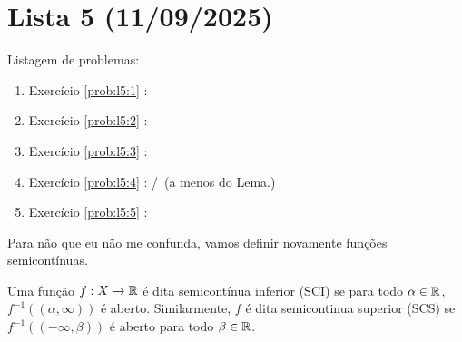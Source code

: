 \section{Lista 5 (11/09/2025)}

Listagem de problemas:
\begin{enumerate}
    \item Exercício \ref{prob:l5:1} : \checkmark
    \item Exercício \ref{prob:l5:2} : \checkmark
    \item Exercício \ref{prob:l5:3} : \checkmark
    \item Exercício \ref{prob:l5:4} : \Frowny/\checkmark\, (a menos do Lema.)
    \item Exercício \ref{prob:l5:5} : \checkmark
\end{enumerate}

\begin{problem}
    \label{prob:l5:1}
\end{problem}
Para não que eu não me confunda, vamos definir novamente funções semicontínuas.
\begin{definition}
    Uma função $f: X \rightarrow \mathbb{R}$ é dita semicontínua inferior (SCI) se para todo $\alpha \in \mathbb{R}$,
    $f^{-1}( (\alpha, \infty) )$ é aberto. Similarmente, $f$ é dita semicontinua superior (SCS)
    se $f^{-1}((-\infty, \beta))$ é aberto para todo $\beta \in \mathbb{R}$.
\end{definition}

